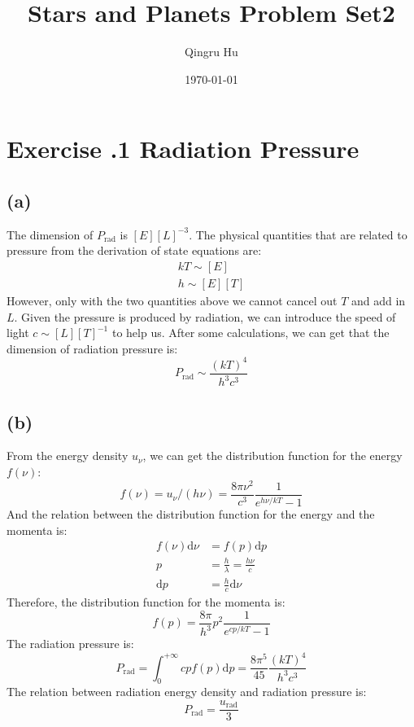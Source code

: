 \documentclass[a4paper,12pt]{article}
\title{Stars and Planets Problem Set2}
\author{Qingru Hu}
\date{\today}
\begin{document}
\maketitle
\section*{\textbf{Exercise \uppercase\expandafter{}.1 Radiation Pressure}}
\subsection*{(a)}
The dimension of $P_{\text{rad}}$ is $[E][L]^{-3}$. The physical quantities that are related to 
pressure from the derivation of state equations are:
\begin{align*}
    kT \sim [E] \\
    h \sim [E][T]
\end{align*}
However, only with the two quantities above we cannot cancel out $T$ and add in $L$. 
Given the pressure is produced by radiation, 
we can introduce the speed of light $c \sim  [L][T]^{-1}$ to help us.
After some calculations, we can get that the dimension of radiation pressure is:
\begin{equation*}
    P_{\text{rad}} \sim \frac{(kT)^4}{h^3c^3}
\end{equation*}

\subsection*{(b)}
From the energy density $u_\nu$, we can get the distribution function for the energy $f(\nu)$:
\begin{equation*}
    f(\nu) = u_\nu / (h\nu) = \frac{8\pi \nu^2}{c^3} \frac{1}{e^{h\nu/kT} - 1}
\end{equation*}
And the relation between the distribution function for the energy and the momenta is:
\begin{align*}
    f(\nu) \text{d}\nu &= f(p) \text{d}p \\
    p &= \frac{h}{\lambda} = \frac{h\nu}{c} \\
    \text{d}p &= \frac{h}{c} \text{d}\nu
\end{align*}
Therefore, the distribution function for the momenta is:
\begin{equation*}
    f(p) = \frac{8\pi}{h^3} p^2 \frac{1}{e^{cp/kT}-1}
\end{equation*}
The radiation pressure is:
\begin{equation*}
    P_{\text{rad}} = \int_0^{+\infty} c p f(p) \text{d} p = \frac{8\pi^5}{45} \frac{(kT)^4}{h^3 c^3}
\end{equation*}
The relation between radiation energy density and radiation pressure is:
\begin{equation*}
    P_\text{rad} = \frac{u_\text{rad}}{3}
\end{equation*}
\end{document}
